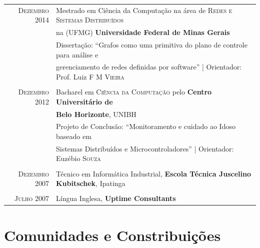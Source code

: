 \documentclass[a4paper,10pt]{article} %
\begin{document}
\begin{tabular}{rl}
\textsc{Dezembro} 2014 & Mestrado em Ciência da Computação na área de
\textsc{Redes e Sistemas Distribuídos}
\\ & na (UFMG)
\textbf{Universidade Federal de Minas Gerais} \\
& Dissertação: ``Grafos como uma primitiva do plano de controle para análise e
\\ & gerenciamento de redes definidas por software''
| \small Orientador: Prof. Luiz \textsc{F M Vieira} \\
&\\


\textsc{Dezembro} 2012& Bacharel em \textsc{Ciência da Computação}
pelo \normalsize\textbf{Centro Universitário de}
\\ & \textbf{Belo Horizonte}, UNIBH \\
& Projeto de Conclusão: ``Monitoramento e cuidado ao Idoso baseado em
\\ & Sistemas Distribuídos e Microcontroladores''
| \small Orientador: Euzébio \textsc{Souza} \\
&\\


\textsc{Dezembro} 2007 & Técnico em Informática Industrial,
\textbf{Escola Técnica Juscelino Kubitschek}, Ipatinga \\
&\\


\textsc{Julho} 2007 & Língua Inglesa, \textbf{Uptime Consultants}
\end{tabular}





\section{Comunidades e Constribuições}
\end{document}
